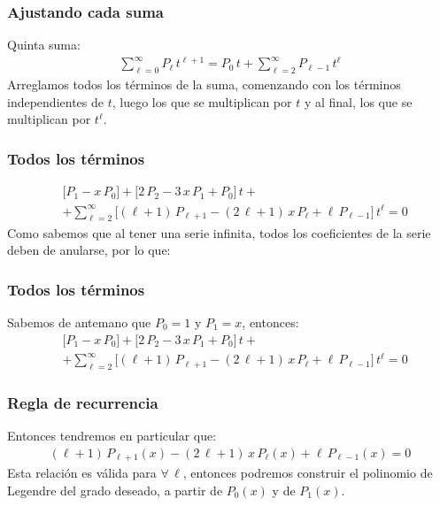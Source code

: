 \begin{frame}
\frametitle{Ajustando cada suma}
Quinta suma:
\begin{align*}
\sum_{\ell=0}^{\infty} P_{\ell} \, t^{\ell+1} = P_{0} \, t + \sum_{\ell=2}^{\infty} P_{\ell-1} \, t^{\ell}
\end{align*}
\pause
Arreglamos todos los términos de la suma, comenzando con los términos independientes de $t$, luego los que se multiplican por $t$ y al final, los que se multiplican por $t^{\ell}$.
\end{frame}
\begin{frame}
\frametitle{Todos los términos}
\begin{align*}
&\bigg[ P_{1} - x \, P_{0} \bigg] + \bigg[ 2 \, P_{2} - 3 \, x \, P_{1} + P_{0} \bigg] \, t + \\[0.5em]
&+ \sum_{\ell=2}^{\infty} \bigg[ (\ell + 1) \, P_{\ell+1} {-} (2 \, \ell + 1) \, x \, P_{\ell} {+} \ell \, P_{\ell-1} \bigg] \, t^{\ell} = 0
\end{align*}
\pause
Como sabemos que al tener una serie infinita, todos los coeficientes de la serie deben de anularse, por lo que:
\end{frame}
\begin{frame}
\frametitle{Todos los términos}
Sabemos de antemano que $P_{0} = 1$ y $P_{1} = x$, entonces:
\pause
\begin{align*}
&\bigg[ P_{1} - x \, P_{0} \bigg] + \bigg[ 2 \, P_{2} - 3 \, x \, P_{1} + P_{0} \bigg] \, t + \\[0.5em]
&+ \sum_{\ell=2}^{\infty} \bigg[ (\ell + 1) \, P_{\ell+1} {-} (2 \, \ell + 1) \, x \, P_{\ell} {+} \ell \, P_{\ell-1} \bigg] \, t^{\ell} = 0
\end{align*}
\end{frame}
\begin{frame}
\frametitle{Regla de recurrencia}
Entonces tendremos en particular que:
\begin{align*}
(\ell + 1) \, P_{\ell+1} (x) - (2 \, \ell + 1) \, x \, P_{\ell} (x) + \ell \, P_{\ell-1} (x) = 0
\end{align*}
Esta relación es válida para $\forall \, \ell$, entonces podremos construir el polinomio de Legendre del grado deseado, a partir de $P_{0}(x)$ y de $P_{1}(x)$.
\end{frame}
